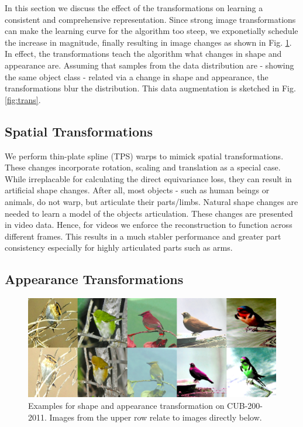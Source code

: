 		In this section we discuss the effect of the transformations on learning a consistent and comprehensive representation.
		Since strong image transformations can make the learning curve for the algorithm too steep, we exponetially schedule the increase in magnitude, finally resulting in image changes as shown in Fig. \ref{fig:coloraugm}.
		In effect, the transformations teach the algorithm what changes in shape and appearance are. Assuming that samples from the data distribution are - showing the same object class - related via a change in shape and appearance, the transformations blur the distribution. This data augmentation is sketched in Fig. \ref{fig:trans}.


		\subsection{Spatial Transformations}\label{sec:warps}
			We perform thin-plate spline (TPS) warps to mimick spatial transformations. These changes incorporate rotation, scaling and translation as a special case. While irreplacable for calculating the direct equivariance loss, they can result in artificial shape changes. After all, most objects - such as human beings or animals, do not warp, but articulate their parts/limbs.
			Natural shape changes are needed to learn a model of the objects articulation. These changes are presented in video data. Hence, for videos we enforce the reconstruction to function across different frames. This results in a much stabler performance and greater part consistency especially for highly articulated parts such as arms.

		\subsection{Appearance Transformations}
			\begin{figure}[htp]
				\centering
				\includegraphics[trim={0cm 0cm 0cm 0cm},clip, width=.8\linewidth]{fig/shape/coloraugm}
				\caption{Examples for shape and appearance transformation on CUB-200-2011. Images from the upper row relate to images directly below.}
				\label{fig:coloraugm}
			\end{figure}

